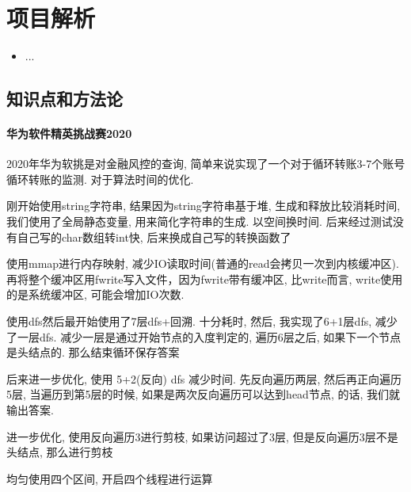 \chapter{项目解析}
\label{chap1}
\begin{itemize}[noitemsep,topsep=0pt,parsep=0pt,partopsep=0pt]
	\item ...
\end{itemize}

\section{知识点和方法论}
\subsubsection{华为软件精英挑战赛2020}
2020年华为软挑是对金融风控的查询, 简单来说实现了一个对于循环转账3-7个账号循环转账的监测. 对于算法时间的优化. \par
刚开始使用string字符串, 结果因为string字符串基于堆, 生成和释放比较消耗时间, 我们使用了全局静态变量, 用来简化字符串的生成. 以空间换时间. 后来经过测试没有自己写的char数组转int快, 后来换成自己写的转换函数了 \par
使用mmap进行内存映射, 减少IO读取时间(普通的read会拷贝一次到内核缓冲区). 再将整个缓冲区用fwrite写入文件，因为fwrite带有缓冲区, 比write而言, write使用的是系统缓冲区, 可能会增加IO次数.\par
使用dfs然后最开始使用了7层dfs+回溯. 十分耗时, 然后, 我实现了6+1层dfs, 减少了一层dfs. 减少一层是通过开始节点的入度判定的, 遍历6层之后, 如果下一个节点是头结点的. 那么结束循环保存答案\par
后来进一步优化, 使用 5+2(反向) dfs 减少时间. 先反向遍历两层, 然后再正向遍历5层, 当遍历到第5层的时候, 如果是两次反向遍历可以达到head节点, 的话, 我们就输出答案. \par
进一步优化, 使用反向遍历3进行剪枝, 如果访问超过了3层, 但是反向遍历3层不是头结点, 那么进行剪枝 \par
均匀使用四个区间, 开启四个线程进行运算 \par
